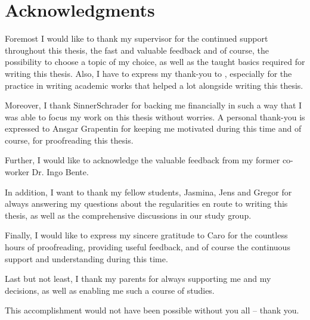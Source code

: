\chapter*{Acknowledgments}
\thispagestyle{noheader}

Foremost I would like to thank my supervisor \firstTutor{} for the continued support throughout this thesis, the fast and valuable feedback and of course, the possibility to choose a topic of my choice, as well as the taught basics required for writing this thesis. Also, I have to express my thank-you to \secondTutor, especially for the practice in writing academic works that helped a lot alongside writing this thesis.

Moreover, I thank SinnerSchrader for backing me financially in such a way that I was able to focus my work on this thesis without worries. A personal thank-you is expressed to Ansgar Grapentin for keeping me motivated during this time and of course, for proofreading this thesis.

Further, I would like to acknowledge the valuable feedback from my former co-worker Dr. Ingo Bente.

In addition, I want to thank my fellow students, Jasmina, Jens and Gregor for always answering my questions about the regularities en route to writing this thesis, as well as the comprehensive discussions in our study group.

Finally, I would like to express my sincere gratitude to Caro for the countless hours of proofreading, providing useful feedback, and of course the continuous support and understanding during this time.

Last but not least, I thank my parents for always supporting me and my decisions, as well as enabling me such a course of studies.

This accomplishment would not have been possible without you all -- thank you.

\newpage